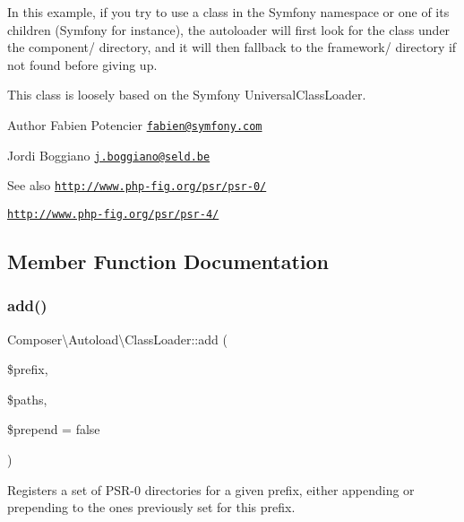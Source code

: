 In this example, if you try to use a class in the Symfony namespace or one of its children (Symfony for instance), the autoloader will first look for the class under the component/ directory, and it will then fallback to the framework/ directory if not found before giving up.

This class is loosely based on the Symfony Universal\+Class\+Loader.

\begin{DoxyAuthor}{Author}
Fabien Potencier \href{mailto:fabien@symfony.com}{\tt fabien@symfony.\+com} 

Jordi Boggiano \href{mailto:j.boggiano@seld.be}{\tt j.\+boggiano@seld.\+be} 
\end{DoxyAuthor}
\begin{DoxySeeAlso}{See also}
\href{http://www.php-fig.org/psr/psr-0/}{\tt http\+://www.\+php-\/fig.\+org/psr/psr-\/0/} 

\href{http://www.php-fig.org/psr/psr-4/}{\tt http\+://www.\+php-\/fig.\+org/psr/psr-\/4/} 
\end{DoxySeeAlso}


\subsection{Member Function Documentation}
\mbox{\label{classComposer_1_1Autoload_1_1ClassLoader_aa99f46d61bdf20b924a1bb08bfcb90bd}} 
\subsubsection{\texorpdfstring{add()}{add()}}
{\footnotesize\ttfamily Composer\textbackslash{}\+Autoload\textbackslash{}\+Class\+Loader\+::add (\begin{DoxyParamCaption}\item[{}]{\$prefix,  }\item[{}]{\$paths,  }\item[{}]{\$prepend = {\ttfamily false} }\end{DoxyParamCaption})}

Registers a set of P\+S\+R-\/0 directories for a given prefix, either appending or prepending to the ones previously set for this prefix.


